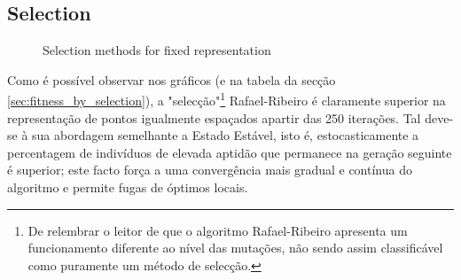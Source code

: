 \documentclass[a4paper]{article}
\begin{document}
\cleardoublepage

\subsection{Selection}
\begin{figure}[ht]
	\centering
	\caption{Selection methods for fixed representation}
\end{figure}
\indent Como é possível observar nos gráficos (e na tabela da secção \ref{sec:fitness_by_selection}), a "selecção"\footnote[1]{De relembrar o leitor de que o algoritmo Rafael-Ribeiro
apresenta um funcionamento diferente ao nível das mutações, não sendo assim classificável como puramente um método de selecção.} Rafael-Ribeiro é claramente
superior na representação de pontos igualmente espaçados apartir das 250 iterações. Tal deve-se à sua abordagem semelhante a Estado Estável, isto é, estocasticamente a percentagem de
indivíduos de elevada aptidão que permanece na geração seguinte é superior; este facto força a uma convergência mais gradual e contínua do algoritmo e permite fugas de óptimos locais.
\end{document}
